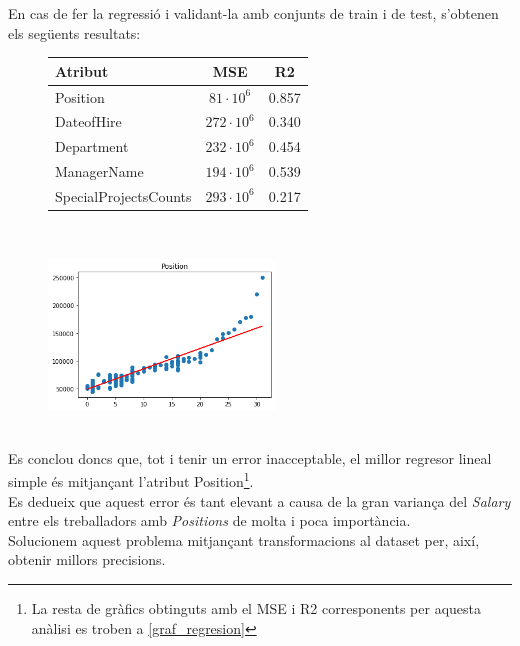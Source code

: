 \documentclass[a4paper, 11pt]{article}
\begin{document}
En cas de fer la regressió i validant-la amb conjunts de train i de test, s'obtenen els següents resultats:
\begin{figure}[h] %
\begin{minipage}{8cm} %
\begin{center}
    \begin{tabular}{l||c|c}
        \textbf{Atribut} & MSE & R2 \\ \hline \hline
        Position & $81\cdot 10^6$ & 0.857 \\\hline
        DateofHire & $272\cdot 10^6$ & 0.340 \\\hline
        Department & $232\cdot 10^6$ & 0.454 \\\hline
        ManagerName & $194\cdot 10^6$ & 0.539 \\\hline
        SpecialProjectsCounts & $293\cdot 10^6$ & 0.217 \\
    \end{tabular}\\
    \label{tab:afins}
\end{center}
\end{minipage} %
\hspace{2em}
\begin{minipage}{6.3cm} %
\begin{center}
   \begin{center}
    \includegraphics[width=6cm]{REGRESIONS_LINEALS/lineal_position.png}
    \label{regresor_lineal_simple}
    \end{center}
\end{center}
\end{minipage} %
\end{figure} %
\\
Es conclou doncs que, tot i tenir un error inacceptable, el millor regresor lineal simple és mitjançant l'atribut Position\footnote{La resta de gràfics obtinguts amb el MSE i R2 corresponents per aquesta anàlisi es troben a \textcolor{blue}{\ref{graf_regresion}}}.\\
Es dedueix que aquest error és tant elevant a causa de la gran variança del \textit{Salary} entre els treballadors amb \textit{Positions} de molta i poca importància.\\
Solucionem aquest problema mitjançant transformacions al dataset per, així, obtenir millors precisions.
\newpage
\end{document}
